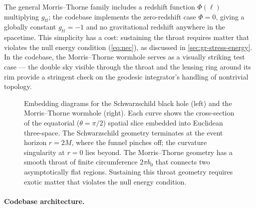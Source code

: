 The general Morris--Thorne family includes a redshift function
$\Phi(\ell)$ multiplying $g_{tt}$; the codebase implements the
zero-redshift case $\Phi = 0$, giving a globally constant
$g_{tt} = -1$ and no gravitational redshift anywhere in the
spacetime.  This simplicity has a cost: sustaining the throat requires
matter that violates the null energy condition (\cref{eq:nec}), as
discussed in \cref{sec:gr-stress-energy}.  In the codebase, the
Morris--Thorne wormhole serves as a visually striking test case ---
the double sky visible through the throat and the lensing ring around
its rim provide a stringent check on the geodesic integrator's
handling of nontrivial topology.

\begin{figure}[ht]
  \centering
  
  \caption[Embedding diagrams for Schwarzschild and Morris-Thorne spacetimes]{%
    Embedding diagrams for the Schwarzschild black hole (left) and the
    Morris--Thorne wormhole (right).  Each curve shows the cross-section
    of the equatorial ($\theta = \pi/2$) spatial slice embedded into
    Euclidean three-space.  The Schwarzschild geometry terminates at the
    event horizon $r = 2M$, where the funnel pinches off; the curvature
    singularity at $r = 0$ lies beyond.  The Morris--Thorne geometry has
    a smooth throat of finite circumference $2\pi b_0$ that connects two
    asymptotically flat regions.  Sustaining this throat geometry requires
    exotic matter that violates the null energy condition.}
  \label{fig:embedding-diagrams}
\end{figure}

\paragraph{Codebase architecture.}

